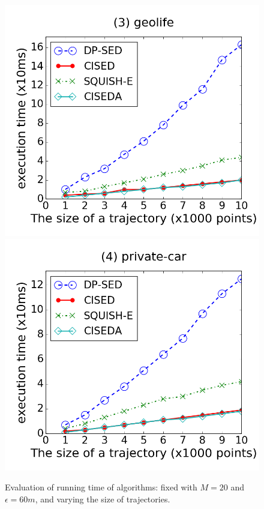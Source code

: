 \begin{figure}[tb!]
\includegraphics[scale = 0.250]{figures/Exp-time-size-geolife.png}
\includegraphics[scale = 0.250]{figures/Exp-time-size-private.png}
\vspace{-2ex}
\caption{\small Evaluation of running time of \lsa algorithms: fixed with $M=20$ and $\epsilon=60m$, and varying the size of trajectories.}
\label{fig:time-size}
\vspace{-2ex}
\end{figure}





